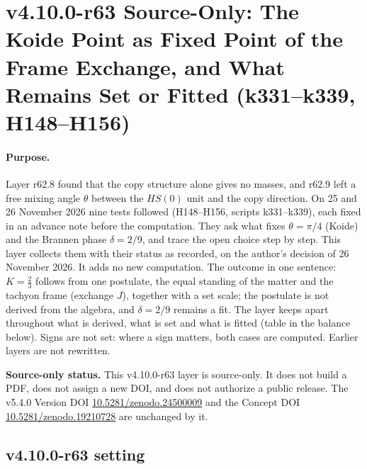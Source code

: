 
\clearpage
\section*{v4.10.0-r63 Source-Only: The Koide Point as Fixed Point of the Frame Exchange, and What Remains Set or Fitted (k331--k339, H148--H156)}
\label{sec:v4100-r63-koide-frame-exchange}

\paragraph{Purpose.}
Layer r62.8 found that the copy structure alone gives no masses, and r62.9 left a free mixing angle \(\theta\) between the \(HS(0)\) unit and
the copy direction.  On 25 and 26 November 2026 nine tests followed (H148--H156, scripts k331--k339), each fixed in an advance note before the
computation.  They ask what fixes \(\theta=\pi/4\) (Koide) and the Brannen phase \(\delta=2/9\), and trace the open choice step by step.  This
layer collects them with their status as recorded, on the author's decision of 26 November 2026.  It adds no new computation.  The outcome in one
sentence: \(K=\tfrac23\) follows from one postulate, the equal standing of the matter and the tachyon frame (exchange \(J\)), together with a set
scale; the postulate is not derived from the algebra, and \(\delta=2/9\) remains a fit.  The layer keeps apart throughout what is derived, what
is set and what is fitted (table in the balance below).  Signs are not set: where a sign matters, both cases are computed.  Earlier layers are
not rewritten.

\noindent\textbf{Source-only status.}
This v4.10.0-r63 layer is source-only.  It does not build a PDF, does not assign a new DOI,
and does not authorize a public release.  The v5.4.0 Version DOI
\href{https://doi.org/10.5281/zenodo.24500009}{10.5281/zenodo.24500009} and the Concept DOI
\href{https://doi.org/10.5281/zenodo.19210728}{10.5281/zenodo.19210728} are unchanged by it.

\subsection*{v4.10.0-r63 setting}
\label{subsec:v4100-r63-setting}

